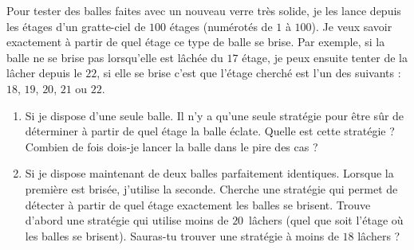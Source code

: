 \documentclass[class=report,crop=false, 12pt]{standalone}
\begin{document}
\begin{activite}

Pour tester des balles faites avec un nouveau verre très solide, je les lance depuis les étages d'un gratte-ciel de $100$ étages (numérotés de $1$ à $100$). Je veux savoir exactement à partir de quel étage ce type de balle se brise. Par exemple, si la balle ne se brise pas lorsqu'elle est lâchée du $17$\ieme{} étage, je peux ensuite tenter de la lâcher depuis le $22$\ieme{}, si elle se brise c'est que 
l'étage cherché est l'un des suivants : $18$, $19$, $20$, $21$ ou $22$.
 
\begin{enumerate}
  \item Si je dispose d'une seule balle. Il n'y a qu'une seule stratégie pour être sûr de déterminer à partir de quel étage la balle éclate. Quelle est cette stratégie ? Combien de fois dois-je lancer la balle dans le pire des cas ?

  \item Si je dispose maintenant de deux balles parfaitement identiques. Lorsque la première est brisée, j'utilise la seconde. Cherche une stratégie qui permet de détecter à partir de quel étage exactement les balles se brisent.
Trouve d'abord une stratégie qui utilise moins de $20$~lâchers (quel que soit l'étage où les balles se brisent).
Sauras-tu trouver une stratégie à moins de $18$ lâchers ?  
\end{enumerate}

\end{activite}
\end{document}
